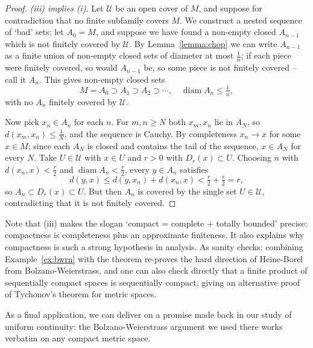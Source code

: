 \documentclass[a4paper]{scrartcl}
\newcommand{\diam}{\operatorname{diam}}
\begin{document}
\begin{proof}
    \emph{(iii) implies (i)}. Let $\mathcal{U}$ be an open cover of $M$, and suppose for contradiction that no finite subfamily covers $M$. We construct a nested sequence of `bad' sets: let $A_0 = M$, and suppose we have found a non-empty closed $A_{n - 1}$ which is not finitely covered by $\mathcal{U}$. By Lemma~\ref{lemma:chop} we can write $A_{n - 1}$ as a finite union of non-empty closed sets of diameter at most $\frac{1}{n}$; if each piece were finitely covered, so would $A_{n-1}$ be, so some piece is not finitely covered -- call it $A_n$. This gives non-empty closed sets
    $$
    M = A_0 \supset A_1 \supset A_2 \supset \cdots, \quad \diam A_n \leq \tfrac{1}{n},
    $$
    with no $A_n$ finitely covered by $\mathcal{U}$.

    Now pick $x_n \in A_n$ for each $n$. For $m, n \geq N$ both $x_m, x_n$ lie in $A_N$, so $d(x_m, x_n) \leq \frac{1}{N}$, and the sequence is Cauchy. By completeness $x_n \rightarrow x$ for some $x \in M$; since each $A_N$ is closed and contains the tail of the sequence, $x \in A_N$ for every $N$. Take $U \in \mathcal{U}$ with $x \in U$ and $r > 0$ with $D_r(x) \subset U$. Choosing $n$ with $d(x_n, x) < \frac{r}{2}$ and $\diam A_n < \frac{r}{2}$, every $y \in A_n$ satisfies
    $$
    d(y, x) \leq d(y, x_n) + d(x_n, x) < \tfrac{r}{2} + \tfrac{r}{2} = r,
    $$
    so $A_n \subset D_r(x) \subset U$. But then $A_n$ is covered by the single set $U \in \mathcal{U}$, contradicting that it is not finitely covered.
\end{proof}

\begin{remark}
    Note that (iii) makes the slogan `compact = complete + totally bounded' precise: compactness is completeness plus an approximate finiteness. It also explains why compactness is such a strong hypothesis in analysis. As sanity checks: combining Example~\ref{ex:bwrn} with the theorem re-proves the hard direction of Heine-Borel from Bolzano-Weierstrass, and one can also check directly that a finite product of sequentially compact spaces is sequentially compact, giving an alternative proof of Tychonov's theorem for metric spaces.
\end{remark}

As a final application, we can deliver on a promise made back in our study of uniform continuity: the Bolzano-Weierstrass argument we used there works verbatim on any compact metric space.
\end{document}
